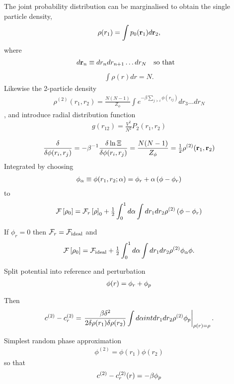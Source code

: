 The joint probability distribution can be marginalised to obtain the single particle density,
\begin{align}
\rho(r_1) = \int p_0({\mathbf{\textbf{r}}}_1) d{\mathbf{\textbf{r}}}_2,
\end{align}
where 
\begin{align}
  d{\mathbf{\textbf{r}}}_n &\equiv dr_ndr_{n+1}\ldots dr_N \quad \text{so that}
\end{align}
\begin{align}
  \int \rho(r) dr = N.
\end{align}
Likewise the 2-particle density
\begin{align}
 \rho^{(2)}(r_1, r_2) = \frac{N(N-1)}{Z_\phi}\int e^{-\beta \sum_{j>i} \phi(r_{ij})}dr_3 \ldots dr_N
\end{align},
and introduce radial distribution function
\begin{align}
  g(r_{12}) = \frac{V^2}{N^2} P_2(r_1, r_2)
\end{align}


\begin{align}
\frac{  \delta}{\delta \phi(r_i, r_j) } = - \beta^{-1} \frac{\delta \ln \Xi}{\delta \phi(r_i, r_j)} = \frac{N(N-1)}{Z_\phi} = \tfrac{1}{2} \rho^{(2)}(\textbf{r}_1,\textbf{r}_2)
\end{align}
Integrated by choosing
\begin{align}
  \phi_\alpha \equiv \phi(r_1,r_2;\alpha) = \phi_r + \alpha \left( \phi - \phi_r \right)
\end{align}
to 
\begin{align}
  {\cal F}\left[ \rho_0 \right] = {\cal F}_r \left[ \rho \right]_0 + \tfrac{1}{2} \int_0^1d\alpha \int dr_1dr_2 \rho^{(2)}\left( \phi-\phi_r \right)
\end{align}

If $\phi_r = 0$ then ${\cal F}_r = {\cal F}_{\text{ideal}}$ and
\begin{align}
{\cal F}\left[ \rho_0 \right] = {\cal F}_{\text{ideal}} + \tfrac{1}{2} \int_0^1d\alpha \int dr_1dr_2 \rho^{(2)}\phi_\alpha \phi.
\end{align}

Split potential into reference and perturbation
\begin{align}
  \phi(r) = {\phi_r} + {\phi_p}
\end{align}

Then 
\begin{align}
c^{(2)} - c_r^{(2)} = \left.{\frac{\beta \delta^2}{2\delta \rho(r_1) \delta \rho(r_2)} \int d\alpha int dr_1 dr_2 \rho^{(2)} {\phi_p}}\right|_{\rho(r) = \rho}.
\end{align}

Simplest random phase approximation 
\begin{align}
  \phi^{(2)}  = \phi(r_1) \phi (r_2)
\end{align}
so that
\begin{align}
c^{(2)} - c_r^{(2)}(r) = -\beta {\phi_p}
\end{align}

